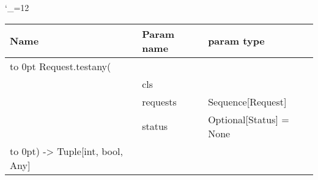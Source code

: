 \begingroup \catcode`\_=12 \tt
\begin{tabular}{lll}
\toprule
\textrm{Name}&\textrm{Param name}&\textrm{param type}\\
\midrule
\hbox to 0pt {Request.testany(\hss}\\
& cls\\
& requests & Sequence[Request]\\
& status & Optional[Status] = None\\
\hbox to 0pt{) -> Tuple[int, bool, Any]\hss}\\
\bottomrule
\end{tabular}
\endgroup
